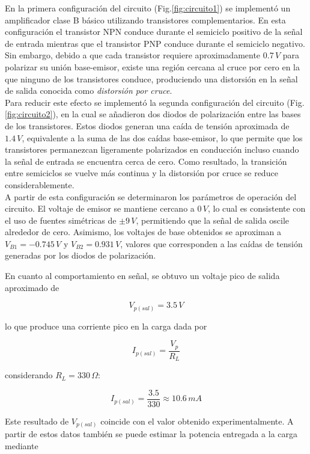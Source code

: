 \documentclass[journal]{IEEEtran}
\begin{document}
En la primera configuración del circuito (Fig.\ref{fig:circuito1}) se implementó un amplificador clase B básico utilizando transistores complementarios. En esta configuración el transistor NPN conduce durante el semiciclo positivo de la señal de entrada mientras que el transistor PNP conduce durante el semiciclo negativo. Sin embargo, debido a que cada transistor requiere aproximadamente $0.7\,V$ para polarizar su unión base-emisor, existe una región cercana al cruce por cero en la que ninguno de los transistores conduce, produciendo una distorsión en la señal de salida conocida como \textit{distorsión por cruce}.\cite{Boylestad} \\

Para reducir este efecto se implementó la segunda configuración del circuito (Fig.\ref{fig:circuito2}), en la cual se añadieron dos diodos de polarización entre las bases de los transistores. Estos diodos generan una caída de tensión aproximada de $1.4\,V$, equivalente a la suma de las dos caídas base-emisor, lo que permite que los transistores permanezcan ligeramente polarizados en conducción incluso cuando la señal de entrada se encuentra cerca de cero. Como resultado, la transición entre semiciclos se vuelve más continua y la distorsión por cruce se reduce considerablemente.\\

A partir de esta configuración se determinaron los parámetros de operación del circuito. El voltaje de emisor se mantiene cercano a $0\,V$, lo cual es consistente con el uso de fuentes simétricas de $\pm 9\,V$, permitiendo que la señal de salida oscile alrededor de cero.\cite{SedraSmith2015} Asimismo, los voltajes de base obtenidos se aproximan a $V_{B1}=-0.745\,V$ y $V_{B2}=0.931\,V$, valores que corresponden a las caídas de tensión generadas por los diodos de polarización.

En cuanto al comportamiento en señal, se obtuvo un voltaje pico de salida aproximado de

\[
V_{p(sal)} = 3.5\,V
\]

lo que produce una corriente pico en la carga dada por

\[
I_{p(sal)} = \frac{V_p}{R_L}
\]

considerando $R_L = 330\,\Omega$:

\[
I_{p(sal)} = \frac{3.5}{330} \approx 10.6\,mA
\]

Este resultado de $V_{p(sal)}$ coincide con el valor obtenido experimentalmente. A partir de estos datos también se puede estimar la potencia entregada a la carga mediante
\end{document}
